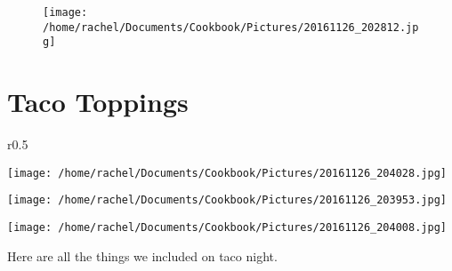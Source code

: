 \documentclass{article}
\begin{document}
\restoregeometry



\newpage
\begin{figure}[]
\texttt{[image: /home/rachel/Documents/Cookbook/Pictures/20161126\_202812.jpg]}
\end{figure}
\restoregeometry
\clearpage
\newpage
{}




\section*{\fontsize{25}{15}\selectfont Taco Toppings}


\begin{wrapfigure}{r}{0.5\textwidth}
\
  \begin{center}
 	\hfill\begin{minipage}{.5\textwidth}\centering
 	\vspace*{-5cm}
		\texttt{[image: /home/rachel/Documents/Cookbook/Pictures/20161126\_204028.jpg]}

		\texttt{[image: /home/rachel/Documents/Cookbook/Pictures/20161126\_203953.jpg]}

		\texttt{[image: /home/rachel/Documents/Cookbook/Pictures/20161126\_204008.jpg]}
	\end{minipage}  
	\end{center}

\end{wrapfigure}



\vspace{5mm}

Here are all the things we included on taco night.
 
\end{document}
